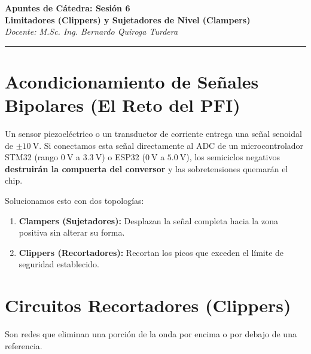 \documentclass[11pt, a4paper]{article}
\begin{document}
\begin{center}
    {\LARGE \textbf{Apuntes de Cátedra: Sesión 6}}\\[0.3cm]
    {\large \textbf{Limitadores (Clippers) y Sujetadores de Nivel (Clampers)}}\\
    \textit{Docente: M.Sc. Ing. Bernardo Quiroga Turdera}
    \vspace{0.3cm}
    \hrule
\end{center}

\vspace{0.3cm}

\section{Acondicionamiento de Señales Bipolares (El Reto del PFI)}
Un sensor piezoeléctrico o un transductor de corriente entrega una señal senoidal de $\pm \qty{10}{\volt}$. Si conectamos esta señal directamente al ADC de un microcontrolador STM32 (rango $\qty{0}{\volt}$ a $\qty{+3.3}{\volt}$) o ESP32 ($\qty{0}{\volt}$ a $\qty{+5.0}{\volt}$), los semiciclos negativos \textbf{destruirán la compuerta del conversor} y las sobretensiones quemarán el chip. 

Solucionamos esto con dos topologías:
\begin{enumerate}
    \item \textbf{Clampers (Sujetadores):} Desplazan la señal completa hacia la zona positiva sin alterar su forma.
    \item \textbf{Clippers (Recortadores):} Recortan los picos que exceden el límite de seguridad establecido.
\end{enumerate}

\section{Circuitos Recortadores (Clippers)}
Son redes que eliminan una porción de la onda por encima o por debajo de una referencia.
\end{document}
